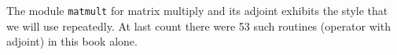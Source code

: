 The module \texttt{matmult}
for matrix multiply and its adjoint
exhibits the style that we will use repeatedly.
At last count there were 53 such routines
(operator with adjoint)
in this book alone.
\begin{comment}
Notice that the module \texttt{matmult}
does not explicitly erase its output before it begins,
as does the pseudo code.
That is because Loptran will always erase for you
the space required for the operator's output.
Loptran also defines a logical variable {\tt adj}
for you to distinguish your computation of the adjoint
$\bold x=\bold x+\bold B\T \bold y$
from the forward operation
$\bold y=\bold y+\bold B\bold x$. 
In computerese, the two lines beginning \#\% are macro expansions
that take compact bits of information which expand
into the verbose boilerplate that Fortran requires.
Loptran is Fortran with these macro expansions.
You can always see how they expand by looking at
\url{http://sep.stanford.edu/sep/prof/}.

\par
What is new in Fortran 90, and will be a big help to us,
is that instead of a subroutine with a single entry.
\end{comment}

